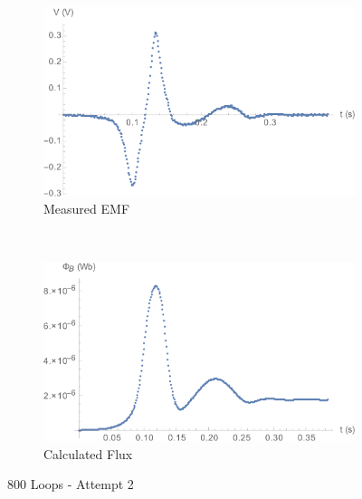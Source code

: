 \documentclass[a4paper]{scrartcl}
\begin{document}
\begin{figure}[p]
    \centering
    \begin{subfigure}[b]{0.45\textwidth}
        \includegraphics[width = \textwidth]{800_2_voltage.png}
        \caption{Measured EMF}
    \end{subfigure}
    ~
    \begin{subfigure}[b]{0.45\textwidth}
        \includegraphics[width = \textwidth]{800_2_flux.png}
        \caption{Calculated Flux}
    \end{subfigure}
    \caption{800 Loops - Attempt 2}
    \label{fig:800_2}
\end{figure}
\end{document}
